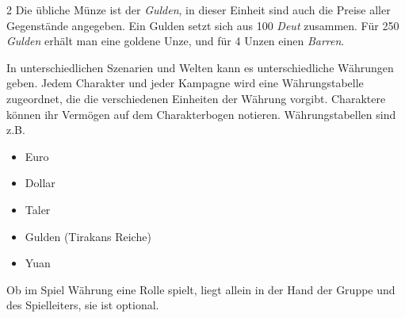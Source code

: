 \begin{multicols}{2}
{Die übliche Münze ist der \textit{Gulden}, in dieser Einheit sind auch die Preise aller Gegenstände angegeben. Ein Gulden setzt sich aus 100 \textit{Deut} zusammen. Für 250 \textit{Gulden} erhält man eine goldene Unze, und für 4 Unzen einen \textit{Barren}.
}{
In unterschiedlichen Szenarien und Welten kann es unterschiedliche Währungen geben. Jedem Charakter und jeder Kampagne wird eine Währungstabelle zugeordnet, die die verschiedenen Einheiten der Währung vorgibt. Charaktere können ihr Vermögen auf dem Charakterbogen notieren. Währungstabellen sind z.B.
\begin{itemize}
    \item Euro
    \item Dollar
    \item Taler
    \item Gulden (Tirakans Reiche)
    \item Yuan
\end{itemize}
Ob im Spiel Währung eine Rolle spielt, liegt allein in der Hand der Gruppe und des Spielleiters, sie ist optional.
}
\end{multicols}
